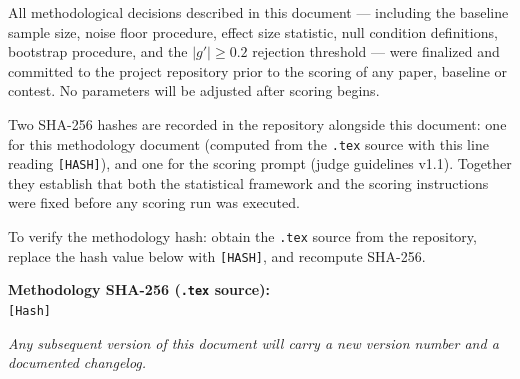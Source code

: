 \documentclass[11pt]{article}
\begin{document}
All methodological decisions described in this document --- including the baseline sample size, noise floor procedure, effect size statistic, null condition definitions, bootstrap procedure, and the $|g'| \geq 0.2$ rejection threshold --- were finalized and committed to the project repository prior to the scoring of any paper, baseline or contest. No parameters will be adjusted after scoring begins.

Two SHA-256 hashes are recorded in the repository alongside this document: one for this methodology document (computed from the \texttt{.tex} source with this line reading \texttt{[HASH]}), and one for the scoring prompt (judge guidelines v1.1). Together they establish that both the statistical framework and the scoring instructions were fixed before any scoring run was executed.

To verify the methodology hash: obtain the \texttt{.tex} source from the repository, replace the hash value below with \texttt{[HASH]}, and recompute SHA-256.

\bigskip
\noindent\textbf{Methodology SHA-256 (\texttt{.tex} source):}\\
\small\texttt{[Hash]}

\bigskip
\noindent\textit{Any subsequent version of this document will carry a new version number and a documented changelog.}
\end{document}
